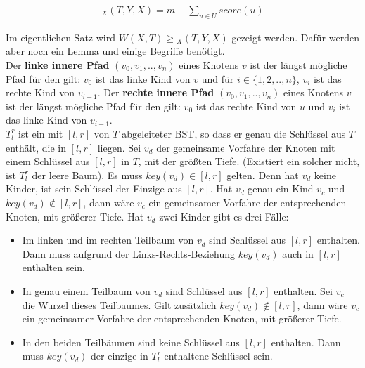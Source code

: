 \documentclass[a4paper,12pt]{article}
\begin{document}
\begin{align*}
_X(T, Y, X)  = m + \sum_{u \in U} {\mathit{score}} \left(u\right)
\end{align*} 

\noindent Im eigentlichen Satz wird $\mathit{W\left(X, T\right)} \geq {_X(T, Y, X)} $ gezeigt werden. Dafür werden aber noch ein Lemma und einige Begriffe benötigt.\\ Der \textbf{linke innere Pfad} $\left(v_0,v_1,..,v_n \right)$ eines Knotens $v$ ist der längst mögliche Pfad für den gilt: $v_0$ ist das linke Kind von $v$ und für $i \in \{1, 2,..,n\}$, $v_i$ ist das rechte Kind von $v_{i-1}$. Der \textbf{rechte innere Pfad} $\left(v_0,v_1,..,v_n \right)$ eines Knotens $v$ ist der längst mögliche Pfad für den gilt: $v_0$ ist das rechte Kind von $u$ und $v_i$ ist das linke Kind von $v_{i-1}$.\\ $T^r_l$ ist ein mit $\left[l,r\right]$ von $T$ abgeleiteter BST, so dass er genau die Schlüssel aus $T$ enthält, die in $\left[l, r\right]$ liegen. Sei $v_d$ der gemeinsame Vorfahre der Knoten mit einem Schlüssel aus  $\left[l,r\right]$ in $T$, mit der größten Tiefe. (Existiert ein solcher nicht, ist $T^r_l$ der leere Baum). Es muss $\mathit{key}(v_d) \in \left[l,r\right]$ gelten. Denn hat $v_d$ keine Kinder, ist sein Schlüssel der Einzige aus $\left[l,r\right]$. Hat $v_d$ genau ein Kind $v_{c}$ und $\mathit{key}(v_d) \notin \left[l,r\right]$, dann wäre $v_{c}$ ein gemeinsamer Vorfahre der entsprechenden Knoten, mit größerer Tiefe. Hat $v_d$ zwei Kinder gibt es drei Fälle:
\begin{itemize}
	\item Im linken und im rechten Teilbaum von $v_d$ sind Schlüssel aus $\left[l,r\right]$ enthalten. Dann muss aufgrund der Links-Rechts-Beziehung  $\mathit{key}(v_d)$ auch in $\left[l,r\right]$ enthalten sein.
	\item In genau einem Teilbaum von $v_d$ sind Schlüssel aus $\left[l,r\right]$ enthalten. Sei $v_{c}$ die Wurzel dieses Teilbaumes. Gilt zusätzlich $\mathit{key}(v_d) \notin \left[l , r\right]$, dann wäre $v_c$ ein  gemeinsamer Vorfahre der entsprechenden Knoten, mit größerer Tiefe.
	\item In den beiden Teilbäumen sind keine Schlüssel aus $\left[l,r\right]$ enthalten.  Dann muss $\mathit{key}(v_d)$ der einzige in $T^r_l$ enthaltene Schlüssel sein.
\end{itemize}
\end{document}
